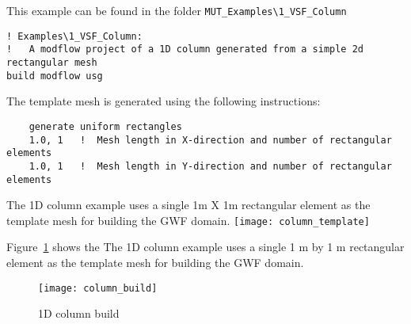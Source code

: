 This example can be found in the folder \verb+MUT_Examples\1_VSF_Column+
\begin{verbatim}
! Examples\1_VSF_Column:
!   A modflow project of a 1D column generated from a simple 2d rectangular mesh
build modflow usg
\end{verbatim}
The template mesh is generated using the following instructions:
\begin{verbatim}
    generate uniform rectangles
    1.0, 1   !  Mesh length in X-direction and number of rectangular elements
    1.0, 1   !  Mesh length in Y-direction and number of rectangular elements
\end{verbatim}


The 1D column example uses a single 1m X 1m rectangular element as the template mesh for building the GWF domain.
    \texttt{[image: column\_template]}



Figure~\ref{fig:1D_Build} shows the The 1D column example uses a single 1 m by 1 m rectangular element as the template mesh for building the GWF domain.
\begin{figure}
    \texttt{[image: column\_build]}
    \caption{1D column build} \label{fig:1D_Build}
\end{figure}
